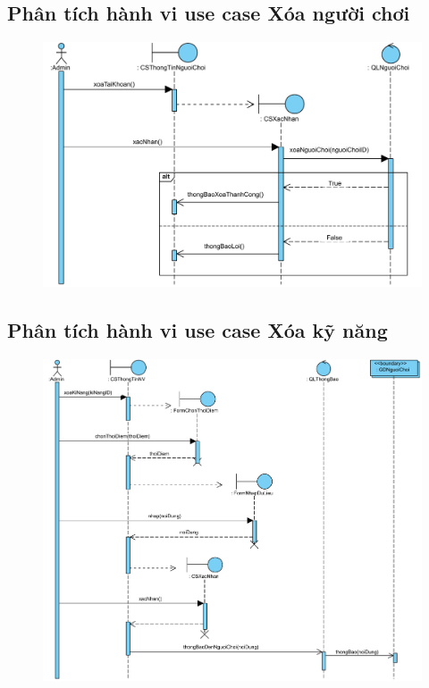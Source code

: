 \documentclass[3p]{elsarticle}
\begin{document}
\subsection{Phân tích hành vi use case Xóa người chơi}
\begin{figure}[!htbp]
	\hspace*{-.5in}
	\centering
	\includegraphics[scale=.55]{images/sequence-pdfs/admin/deletePlayer.pdf}
\end{figure}
\newpage

\subsection{Phân tích hành vi use case Xóa kỹ năng}
\begin{figure}[!htbp]
	\hspace*{-.5in}
	\centering
	\includegraphics[scale=.55]{images/sequence-pdfs/admin/deleteSkill.pdf}
\end{figure}
\newpage
\end{document}
